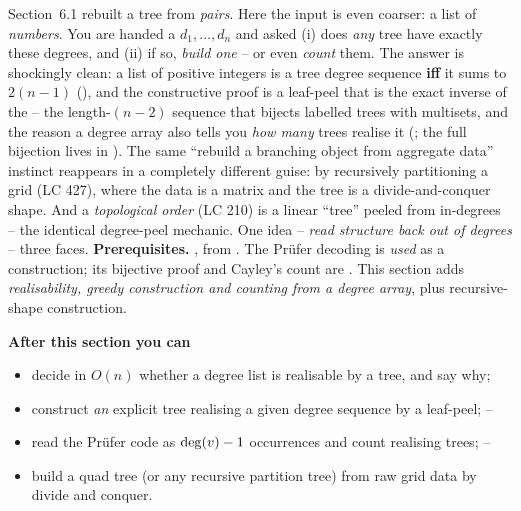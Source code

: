 \begin{topicintro}
Section~6.1 rebuilt a tree from \emph{pairs}. Here the input is even coarser: a list of
\emph{numbers}. You are handed a  $d_1,\dots,d_n$ and asked (i) does
\emph{any} tree have exactly these degrees, and (ii) if so, \emph{build one} -- or even
\emph{count} them. The answer is shockingly clean: a list of positive integers is a tree degree
sequence \textbf{iff} it sums to $2(n-1)$ (), and the constructive proof is a
leaf-peel that is the exact inverse of the  -- the length-$(n-2)$ sequence
that bijects labelled trees with multisets, and the reason a degree array also tells you
\emph{how many} trees realise it (; the full bijection lives in
). The same ``rebuild a branching object from aggregate data'' instinct reappears in a
completely different guise:  by recursively partitioning a grid
(LC 427), where the data is a matrix and the tree is a divide-and-conquer shape. And a
\emph{topological order} (LC 210) is a linear ``tree'' peeled from in-degrees -- the identical
degree-peel mechanic. One idea -- \emph{read structure back out of degrees} -- three faces.
\textbf{Prerequisites.} ,  from . The
Pr\"ufer decoding is \emph{used} as a construction; its bijective proof and Cayley's count are
. This section adds \emph{realisability, greedy construction and counting from a
degree array}, plus recursive-shape construction.

\textbf{After this section you can}
\begin{itemize}[nosep]
  \item decide in $O(n)$ whether a degree list is realisable by a tree, and say why;         \hfill{}
  \item construct \emph{an} explicit tree realising a given degree sequence by a leaf-peel;   \hfill{}--
  \item read the Pr\"ufer code as $\operatorname{deg}(v)-1$ occurrences and count realising trees;        \hfill{}--
  \item build a quad tree (or any recursive partition tree) from raw grid data by divide and conquer. \hfill{}
\end{itemize}
\end{topicintro}

